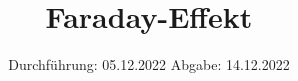 

\subject{Versuch Nr.V46}
\title{Faraday-Effekt}
\date{%
  Durchführung: 05.12.2022
  \hspace{3em}
  Abgabe: 14.12.2022
}



\maketitle
\thispagestyle{empty}
\tableofcontents
\newpage 








\nocite{*}

\printbibliography{}


